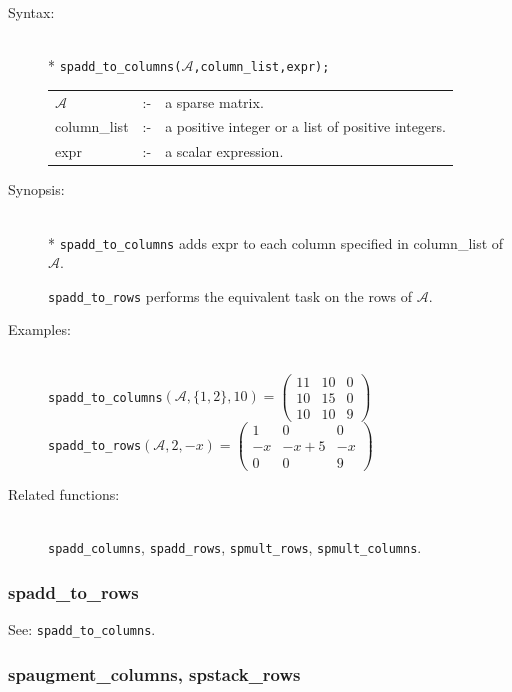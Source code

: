 \begin{description}
  \item[Syntax:]\mbox{}\\*
{\tt spadd\_to\_columns($\mathcal{A}$,column\_list,expr);}\\[2mm]
\begin{tabular}{l l l}
$\mathcal{A}$   &:-& a sparse matrix. \\
column\_list &:-& a positive integer or a list of positive integers. \\
expr        &:-& a scalar expression.
\end{tabular}

\item[Synopsis:]\mbox{}\\*
\texttt{spadd\_to\_columns} adds expr to each column specified in
column\_list of $\mathcal{A}$.

\texttt{spadd\_to\_rows} performs the equivalent task on the rows of
$\mathcal{A}$.

\item[Examples:]\mbox{}\\
\texttt{spadd\_to\_columns}\((\mathcal{A},\{1,2\},10)  =
\begin{pmatrix} 11 & 10 & 0 \\ 10 & 15 & 0 \\ 10 & 10 & 9 \end{pmatrix}\) \\[2mm]
\texttt{spadd\_to\_rows}\((\mathcal{A},2,-x)  =
\begin{pmatrix} 1 & 0 & 0 \\ -x & -x+5 & -x \\ 0 & 0 & 9 \end{pmatrix}\)

\item[Related functions:]\mbox{}\\
\texttt{spadd\_columns}, \texttt{spadd\_rows}, \texttt{spmult\_rows},
\texttt{spmult\_columns}.
\end{description}

\subsubsection{spadd\_to\_rows}
\label{sparse:spadd_to_rows}
\hypertarget{operator:SPADD_TO_ROWS}{}

See: \texttt{spadd\_to\_columns}.


\subsubsection{spaugment\_columns, spstack\_rows}
\label{sparse:spaugment_columns}
\hypertarget{operator:SPAUGMENT_COLUMNS}{}

